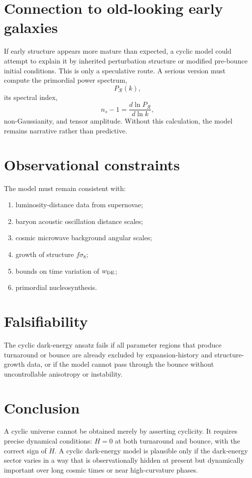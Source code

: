 \documentclass[11pt]{article}
\theoremstyle{remark}
\begin{document}
\section{Connection to old-looking early galaxies}
If early structure appears more mature than expected, a cyclic model could attempt to explain it by inherited perturbation structure or modified pre-bounce initial conditions. This is only a speculative route. A serious version must compute the primordial power spectrum,
\begin{equation}
    P_\mathcal R(k),
\end{equation}
its spectral index,
\begin{equation}
    n_s-1=\frac{d\ln P_\mathcal R}{d\ln k},
\end{equation}
non-Gaussianity, and tensor amplitude. Without this calculation, the model remains narrative rather than predictive.

\section{Observational constraints}
The model must remain consistent with:
\begin{enumerate}[leftmargin=2em]
    \item luminosity-distance data from supernovae;
    \item baryon acoustic oscillation distance scales;
    \item cosmic microwave background angular scales;
    \item growth of structure $f\sigma_8$;
    \item bounds on time variation of $w_{\rm DE}$;
    \item primordial nucleosynthesis.
\end{enumerate}

\section{Falsifiability}
The cyclic dark-energy ansatz fails if all parameter regions that produce turnaround or bounce are already excluded by expansion-history and structure-growth data, or if the model cannot pass through the bounce without uncontrollable anisotropy or instability.

\section{Conclusion}
A cyclic universe cannot be obtained merely by asserting cyclicity. It requires precise dynamical conditions: $H=0$ at both turnaround and bounce, with the correct sign of $\dot H$. A cyclic dark-energy model is plausible only if the dark-energy sector varies in a way that is observationally hidden at present but dynamically important over long cosmic times or near high-curvature phases.
\end{document}
